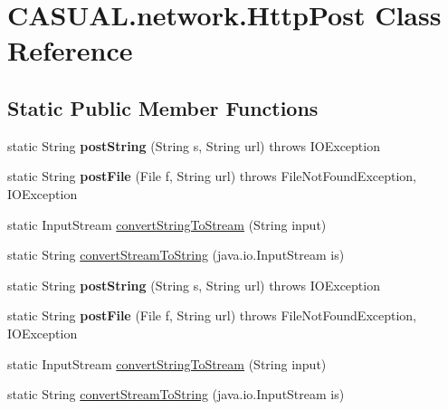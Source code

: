 \hypertarget{class_c_a_s_u_a_l_1_1network_1_1_http_post}{\section{C\-A\-S\-U\-A\-L.\-network.\-Http\-Post Class Reference}
\label{class_c_a_s_u_a_l_1_1network_1_1_http_post}
}
\subsection*{Static Public Member Functions}
\begin{DoxyCompactItemize}
\item 
\hypertarget{class_c_a_s_u_a_l_1_1network_1_1_http_post_a5dba899fc07f05884e7546d68d5f09be}{static String {\bfseries post\-String} (String s, String url)  throws I\-O\-Exception }\label{class_c_a_s_u_a_l_1_1network_1_1_http_post_a5dba899fc07f05884e7546d68d5f09be}

\item 
\hypertarget{class_c_a_s_u_a_l_1_1network_1_1_http_post_a62bba300990ff43d4f3714612d4a7bdf}{static String {\bfseries post\-File} (File f, String url)  throws File\-Not\-Found\-Exception, I\-O\-Exception }\label{class_c_a_s_u_a_l_1_1network_1_1_http_post_a62bba300990ff43d4f3714612d4a7bdf}

\item 
static Input\-Stream \hyperlink{class_c_a_s_u_a_l_1_1network_1_1_http_post_a3c02ceadb037468aa4627391d6c80efe}{convert\-String\-To\-Stream} (String input)
\item 
static String \hyperlink{class_c_a_s_u_a_l_1_1network_1_1_http_post_afb7a5f87cbfa4dae6ecc5e67c6c82a52}{convert\-Stream\-To\-String} (java.\-io.\-Input\-Stream is)
\item 
\hypertarget{class_c_a_s_u_a_l_1_1network_1_1_http_post_a5dba899fc07f05884e7546d68d5f09be}{static String {\bfseries post\-String} (String s, String url)  throws I\-O\-Exception }\label{class_c_a_s_u_a_l_1_1network_1_1_http_post_a5dba899fc07f05884e7546d68d5f09be}

\item 
\hypertarget{class_c_a_s_u_a_l_1_1network_1_1_http_post_a62bba300990ff43d4f3714612d4a7bdf}{static String {\bfseries post\-File} (File f, String url)  throws File\-Not\-Found\-Exception, I\-O\-Exception }\label{class_c_a_s_u_a_l_1_1network_1_1_http_post_a62bba300990ff43d4f3714612d4a7bdf}

\item 
static Input\-Stream \hyperlink{class_c_a_s_u_a_l_1_1network_1_1_http_post_a3c02ceadb037468aa4627391d6c80efe}{convert\-String\-To\-Stream} (String input)
\item 
static String \hyperlink{class_c_a_s_u_a_l_1_1network_1_1_http_post_afb7a5f87cbfa4dae6ecc5e67c6c82a52}{convert\-Stream\-To\-String} (java.\-io.\-Input\-Stream is)
\end{DoxyCompactItemize}


